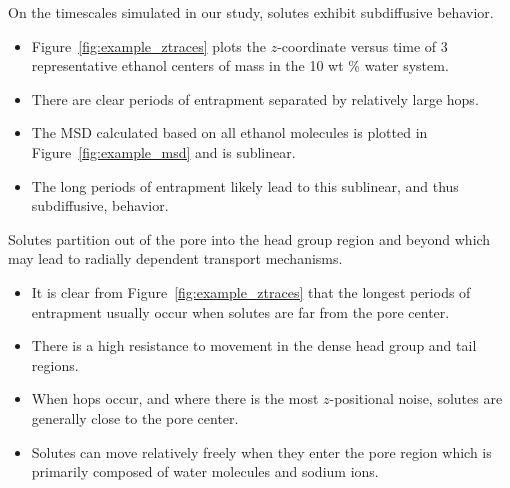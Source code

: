 \documentclass{article}
\begin{document}
  \noindent On the timescales simulated in our study, solutes exhibit subdiffusive behavior.
  \begin{itemize}  
    \item Figure~\ref{fig:example_ztraces} plots the $z$-coordinate versus time of
  	3 representative ethanol centers of mass in the 10 wt \% water system.
  	\item There are clear periods of entrapment separated by relatively large hops.
	\item The MSD calculated based on all ethanol molecules is plotted in 
	Figure~\ref{fig:example_msd} and is sublinear.
	\item The long periods of entrapment likely lead to this sublinear, and thus
	subdiffusive, behavior.
  \end{itemize}
  
  
  \noindent Solutes partition out of the pore into the head group region and beyond which
  may lead to radially dependent transport mechanisms.
  \begin{itemize}
    \item It is clear from Figure~\ref{fig:example_ztraces} that the longest 
    periods of entrapment usually occur when solutes are far from the pore
    center.
    \item There is a high resistance to movement in the dense head group and
    tail regions.
    \item When hops occur, and where there is the most $z$-positional noise, 
    solutes are generally close to the pore center.
    \item Solutes can move relatively freely when they enter the pore region
    which is primarily composed of water molecules and sodium ions.
  \end{itemize}
  
\end{document}
